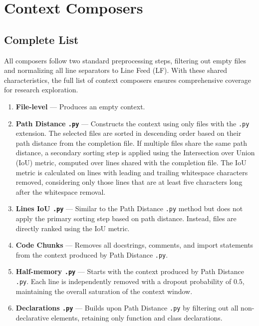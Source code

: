 \section{Context Composers}
\subsection{Complete List}

All composers follow two standard preprocessing steps, filtering out empty files and normalizing all line separators to Line Feed (LF). With these shared characteristics, the full list of context composers ensures comprehensive coverage for research exploration.

\label{appendix:context-composers}
\begin{enumerate}
    \item \textbf{File-level} — Produces an empty context.
    
    \item \textbf{Path Distance \texttt{.py}} — Constructs the context using only files with the \texttt{.py} extension. The selected files are sorted in descending order based on their path distance from the completion file. If multiple files share the same path distance, a secondary sorting step is applied using the Intersection over Union (IoU) metric, computed over lines shared with the completion file. The IoU metric is calculated on lines with leading and trailing whitespace characters removed, considering only those lines that are at least five characters long after the whitespace removal.
    
    \item \textbf{Lines IoU \texttt{.py}} — Similar to the Path Distance \texttt{.py} method but does not apply the primary sorting step based on path distance. Instead, files are directly ranked using the IoU metric.
    
    \item \textbf{Code Chunks} — Removes all docstrings, comments, and import statements from the context produced by Path Distance \texttt{.py}.
    
    \item \textbf{Half-memory \texttt{.py}} — Starts with the context produced by Path Distance \texttt{.py}. Each line is independently removed with a dropout probability of $0.5$, maintaining the overall saturation of the context window.
    
    \item \textbf{Declarations \texttt{.py}} — Builds upon Path Distance \texttt{.py} by filtering out all non-declarative elements, retaining only function and class declarations.
    

\end{enumerate}
